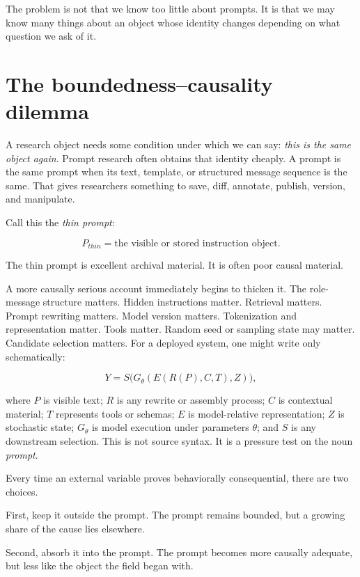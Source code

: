 \documentclass[11pt]{article}
\begin{document}
The problem is not that we know too little about prompts. It is that we may know many things about an object whose identity changes depending on what question we ask of it.

\section{The boundedness--causality dilemma}

A research object needs some condition under which we can say: \emph{this is the same object again}. Prompt research often obtains that identity cheaply. A prompt is the same prompt when its text, template, or structured message sequence is the same. That gives researchers something to save, diff, annotate, publish, version, and manipulate.

Call this the \emph{thin prompt}:

\[
P_{thin} = \text{the visible or stored instruction object}.
\]

The thin prompt is excellent archival material. It is often poor causal material.

A more causally serious account immediately begins to thicken it. The role-message structure matters. Hidden instructions matter. Retrieval matters. Prompt rewriting matters. Model version matters. Tokenization and representation matter. Tools matter. Random seed or sampling state may matter. Candidate selection matters. For a deployed system, one might write only schematically:

\[
Y = S\big(G_{\theta}(E(R(P),C,T),Z)\big),
\]

where \(P\) is visible text; \(R\) is any rewrite or assembly process; \(C\) is contextual material; \(T\) represents tools or schemas; \(E\) is model-relative representation; \(Z\) is stochastic state; \(G_{\theta}\) is model execution under parameters \(\theta\); and \(S\) is any downstream selection. This is not source syntax. It is a pressure test on the noun \emph{prompt}.

Every time an external variable proves behaviorally consequential, there are two choices.

First, keep it outside the prompt. The prompt remains bounded, but a growing share of the cause lies elsewhere.

Second, absorb it into the prompt. The prompt becomes more causally adequate, but less like the object the field began with.
\end{document}
